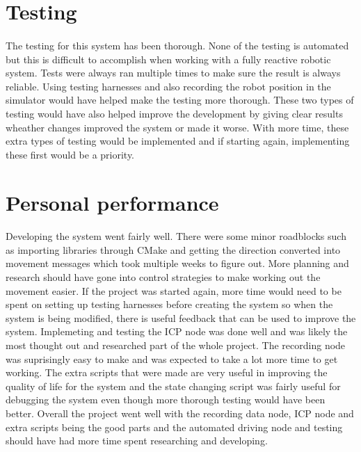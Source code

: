 \section{Testing}
\paragraph{}
The testing for this system has been thorough. None of the testing is automated but this is difficult to accomplish when working with a fully reactive robotic system. Tests were always ran multiple times to make sure the result is always reliable. Using testing harnesses and also recording the robot position in the simulator would have helped make the testing more thorough. These two types of testing would have also helped improve the development by giving clear results wheather changes improved the system or made it worse. With more time, these extra types of testing would be implemented and if starting again, implementing these first would be a priority.

\section{Personal performance}
\paragraph{}
Developing the system went fairly well. There were some minor roadblocks such as importing libraries through CMake and getting the direction converted into movement messages which took multiple weeks to figure out. More planning and research should have gone into control strategies to make working out the movement easier. If the project was started again, more time would need to be spent on setting up testing harnesses before creating the system so when the system is being modified, there is useful feedback that can be used to improve the system. Implemeting and testing the ICP node was done well and was likely the most thought out and researched part of the whole project. The recording node was suprisingly easy to make and was expected to take a lot more time to get working. The extra scripts that were made are very useful in improving the quality of life for the system and the state changing script was fairly useful for debugging the system even though more thorough testing would have been better. Overall the project went well with the recording data node, ICP node and extra scripts being the good parts and the automated driving node and testing should have had more time spent researching and developing.


